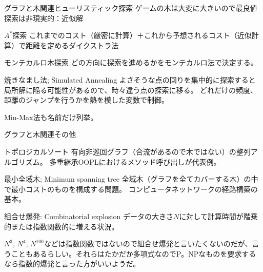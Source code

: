 \documentclass{beamer}
\begin{document}
\begin{frame}[fragile]{グラフと木関連}{ヒューリスティック探索}
ゲームの木は大変に大きいので最良値探索は非現実的：近似解

\begin{exampleblock}{$A^{*}$探索}
これまでのコスト（厳密に計算）＋これから予想されるコスト（近似計算）で距離を定めるダイクストラ法
\end{exampleblock}

\begin{exampleblock}{モンテカルロ木探索}
どの方向に探索を進めるかをモンテカルロ法で決定する。
\end{exampleblock}

\begin{exampleblock}{焼きなまし法; Simulated Annealing}
よさそうな点の回りを集中的に探索すると局所解に陥る可能性があるので、時々違う点の探索に移る。
どれだけの頻度、距離のジャンプを行うかを熱を模した変数で制御。
\end{exampleblock}

Min-Max法も名前だけ列挙。
\end{frame}

\begin{frame}[fragile]{グラフと木関連}{その他}
\begin{exampleblock}{トポロジカルソート}
有向非巡回グラフ（合流があるので木ではない）の整列アルゴリズム。
多重継承OOPLにおけるメソッド呼び出しが代表例。
\end{exampleblock}

\begin{exampleblock}{最小全域木; Minimum spanning tree}
全域木（グラフを全てカバーする木）の中で最小コストのものを構成する問題。
コンピュータネットワークの経路構築の基本。
\end{exampleblock}

\begin{exampleblock}{組合せ爆発: Combinatorial explosion}
データの大きさ$N$に対して計算時間が階乗的または指数関数的に増える状況。
\end{exampleblock}
{
\fontsize{6}{6}\selectfont
$N^3$, $N^4$, $N^{100}$などは指数関数ではないので組合せ爆発と言いたくないのだが、言うこともあるらしい。それらはたかだか多項式なのでP。NPなものを要求するなら指数的爆発と言った方がいいようだ。
}
\end{frame}
\end{document}
